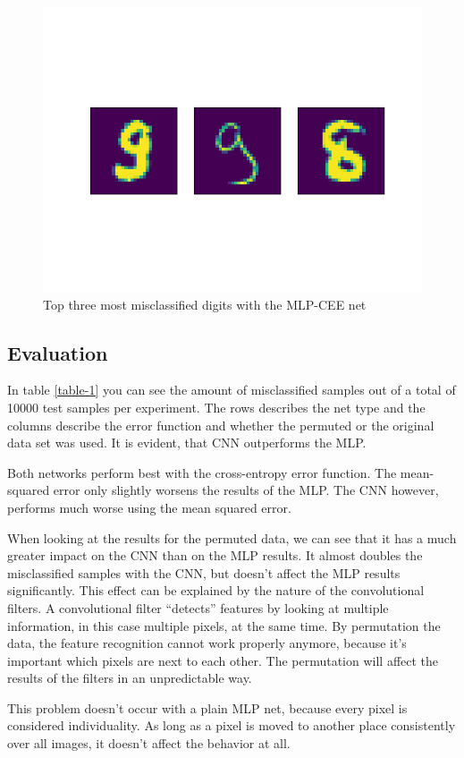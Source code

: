 \documentclass{article}[]
\begin{document}
\begin{figure}[H]
	\centering
	\includegraphics[width=0.5\linewidth]{img/mpl_categorial_cross_non_perm.png}
	\caption{Top three most misclassified digits with the MLP-CEE net}
	\label{fig:mlp}
\end{figure}

\subsection{Evaluation}
\label{evaluation}

In table \ref{table-1} you can see the amount of misclassified samples out of a total of 10000 test samples per experiment.
The rows describes the net type and the columns describe the error function and whether the permuted or the original data set was used.
It is evident, that CNN outperforms the MLP.

Both networks perform best with the cross-entropy error function.
The mean-squared error only slightly worsens the results of the MLP.
The CNN however, performs much worse using the mean squared error.

When looking at the results for the permuted data, we can see that it has a much greater impact on the CNN than on the MLP results.
It almost doubles the misclassified samples with the CNN, but doesn't affect the MLP results significantly.
This effect can be explained by the nature of the convolutional filters.
A convolutional filter \enquote{detects} features by looking at multiple information, in this case multiple pixels, at the same time.
By permutation the data, the feature recognition cannot work properly anymore, because it's important which pixels are next to each other.
The permutation will affect the results of the filters in an unpredictable way.

This problem doesn't occur with a plain MLP net, because every pixel is considered individuality.
As long as a pixel is moved to another place consistently over all images, it doesn't affect the behavior at all.
\end{document}
